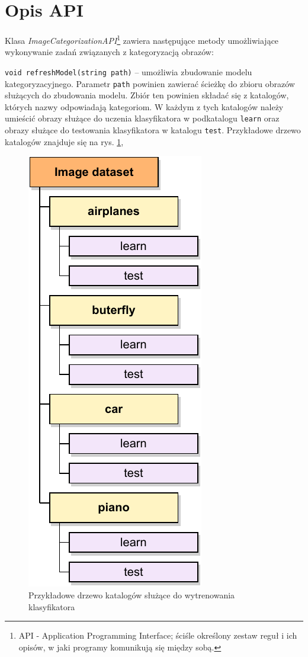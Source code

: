 \section{Opis API}

Klasa \emph{ImageCategorizationAPI}\footnote{API - Application Programming Interface; ściśle określony zestaw reguł i ich opisów, w jaki programy komunikują się między sobą.} zawiera następujące metody umożliwiające wykonywanie zadań związanych z kategoryzacją obrazów:

\begin{compactitem}
	\item \texttt{void refreshModel(string path)} -- umożliwia zbudowanie modelu kategoryzacyjnego. Parametr \texttt{path} powinien zawierać ścieżkę do zbioru obrazów służących do zbudowania modelu. Zbiór ten powinien składać się z katalogów, których nazwy odpowiadają kategoriom. W każdym z tych katalogów należy umieścić obrazy służące do uczenia klasyfikatora w podkatalogu \texttt{learn} oraz obrazy służące do testowania klasyfikatora w katalogu \texttt{test}. Przykładowe drzewo katalogów znajduje się na rys. \ref{fig:api-directory-tree},
	
	\begin{figure}[h]
		\centering
		\includegraphics[scale=1.0]{graphics/03_implementacja/api-directory-tree.pdf}
		\caption{ Przykładowe drzewo katalogów służące do wytrenowania klasyfikatora }
		\label{fig:api-directory-tree}
	\end{figure}
	

\end{compactitem}
